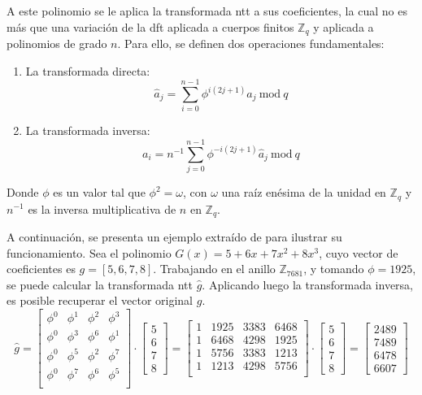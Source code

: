 A este polinomio se le aplica la transformada \gls{ntt} a sus coeficientes, la cual no es más que una variación de la \gls{dft} aplicada a cuerpos finitos \(\mathbb{Z}_q\) y aplicada a polinomios de grado \(n\). Para ello, se definen dos operaciones fundamentales:
\begin{enumerate}
	\item La transformada directa:
	\begin{equation}
		\hat{a}_j=\sum_{i=0}^{n-1} \phi^{i\left(2j+1\right)} a_j \ \text{mod} \ q
	\end{equation}
	\item  La transformada inversa:
	\begin{equation}
		a_i=n^{-1} \sum_{j=0}^{n-1} \phi^{-i\left(2j+1\right)} \hat{a}_j \ \text{mod} \ q
	\end{equation}
\end{enumerate}

Donde $\phi$ es un valor tal que $\phi^2=\omega$, con $\omega$ una raíz enésima de la unidad en \(\mathbb{Z}_q\) y \(n^{-1}\) es la inversa multiplicativa de \(n\) en \(\mathbb{Z}_q\).
\newline

A continuación, se presenta un ejemplo extraído de \cite{cryptoeprint:2024/585} para ilustrar su funcionamiento. Sea el polinomio \(G(x)=5+6x+7x^2+8x^3\), cuyo vector de coeficientes es \(g=[5,6,7,8]\). Trabajando en el anillo \(\mathbb{Z}_{7681}\), y tomando $\phi=1925$, se puede calcular la transformada \gls{ntt} \(\hat{g}\). Aplicando luego la transformada inversa, es posible recuperar el vector original \(g\).
\begin{equation}
	\hat{g}=\begin{bmatrix}
		\phi^0 & \phi^1 & \phi^2 & \phi^3\\
		\phi^0 & \phi^3 & \phi^6 & \phi^1\\
		\phi^0 & \phi^5 & \phi^2 & \phi^7\\
		\phi^0 & \phi^7 & \phi^6 & \phi^5\\
	\end{bmatrix} \cdot \begin{bmatrix}
	5\\
	6\\
	7\\
	8
	\end{bmatrix}=\begin{bmatrix}
	1 & 1925 & 3383 & 6468\\
	1 & 6468 & 4298 & 1925\\
	1 & 5756 & 3383 & 1213\\
	1 & 1213 & 4298 & 5756\\
	\end{bmatrix} \cdot \begin{bmatrix}
	5\\
	6\\
	7\\
	8 \end{bmatrix}= \begin{bmatrix}
	2489\\
	7489\\
	6478\\
	6607 \end{bmatrix}
\end{equation}

